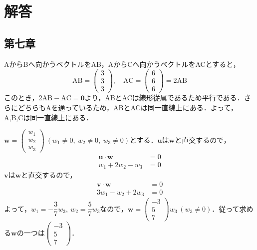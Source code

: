\section*{解答}
\subsection{第七章}
\begin{ans}
AからBへ向かうベクトルをAB，AからCへ向かうベクトルをACとすると，
\[\text{AB}=\begin{pmatrix} 3 \\ 3 \\ 3\end{pmatrix},\quad \text{AC}=\begin{pmatrix} 6 \\ 6 \\ 6\end{pmatrix}=2\text{AB}\]
このとき，$2\text{AB}-\text{AC}=\bm{0}$より，ABとACは線形従属であるため平行である．さらにどちらもAを通っているため，ABとACは同一直線上にある．よって，A,B,Cは同一直線上にある．
\end{ans}

\begin{ans}
$\bm{w}=\begin{pmatrix} w_1 \\ w_2 \\ w_3\end{pmatrix}\ (w_1\neq0,\ w_2\neq0,\ w_3\neq0)$とする．$\bm{u}$は$\bm{w}$と直交するので，
\begin{align*}
\bm{u}\cdot\bm{w}&=0\\
w_1+2w_2-w_3&=0
\end{align*}
$\bm{v}$は$\bm{w}$と直交するので，
\begin{align*}
\bm{v}\cdot\bm{w}&=0\\
3w_1-w_2+2w_3&=0
\end{align*}
よって，$w_1=-\dfrac{3}{7}w_3,\ w_2=\dfrac{5}{7}w_3$なので，$\bm{w}=\begin{pmatrix} -3 \\ 5 \\ 7\end{pmatrix}w_3\ (w_3\neq0)$．従って求める$\bm{w}$の一つは$\begin{pmatrix} -3 \\ 5 \\ 7\end{pmatrix}$．
\end{ans}

